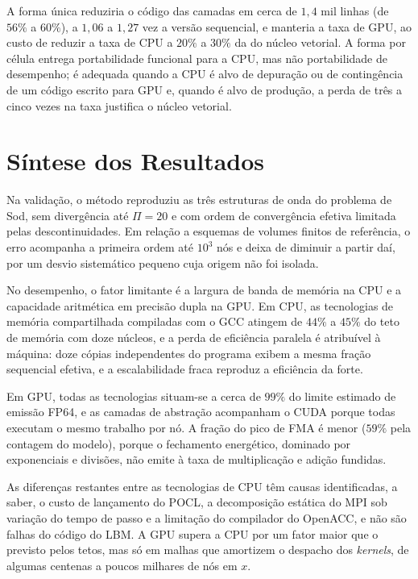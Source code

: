 A forma única reduziria o código das camadas em cerca de \(1{,}4\) mil linhas (de \(56\%\) a \(60\%\)), a \(1{,}06\) a \(1{,}27\) vez a versão sequencial, e manteria a taxa de GPU, ao custo de reduzir a taxa de CPU a \(20\%\) a \(30\%\) da do núcleo vetorial.
A forma por célula entrega portabilidade funcional para a CPU, mas não portabilidade de desempenho; é adequada quando a CPU é alvo de depuração ou de contingência de um código escrito para GPU e, quando é alvo de produção, a perda de três a cinco vezes na taxa justifica o núcleo vetorial.



\section{Síntese dos Resultados}\label{sec:sintese-dos-resultados}

Na validação, o método reproduziu as três estruturas de onda do problema de Sod, sem divergência até \(\Pi = 20\) e com ordem de convergência efetiva limitada pelas descontinuidades.
Em relação a esquemas de volumes finitos de referência, o erro acompanha a primeira ordem até \(10^3\) nós e deixa de diminuir a partir daí, por um desvio sistemático pequeno cuja origem não foi isolada.

No desempenho, o fator limitante é a largura de banda de memória na CPU e a capacidade aritmética em precisão dupla na GPU.
Em CPU, as tecnologias de memória compartilhada compiladas com o GCC atingem de \(44\%\) a \(45\%\) do teto de memória com doze núcleos, e a perda de eficiência paralela é atribuível à máquina: doze cópias independentes do programa exibem a mesma fração sequencial efetiva, e a escalabilidade fraca reproduz a eficiência da forte.

Em GPU, todas as tecnologias situam-se a cerca de \(99\%\) do limite estimado de emissão FP64, e as camadas de abstração acompanham o CUDA porque todas executam o mesmo trabalho por nó.
A fração do pico de FMA é menor (\(59\%\) pela contagem do modelo), porque o fechamento energético, dominado por exponenciais e divisões, não emite à taxa de multiplicação e adição fundidas.

As diferenças restantes entre as tecnologias de CPU têm causas identificadas, a saber, o custo de lançamento do POCL, a decomposição estática do MPI sob variação do tempo de passo e a limitação do compilador do OpenACC, e não são falhas do código do LBM.
A GPU supera a CPU por um fator maior que o previsto pelos tetos, mas só em malhas que amortizem o despacho dos \textit{kernels}, de algumas centenas a poucos milhares de nós em \(x\).

